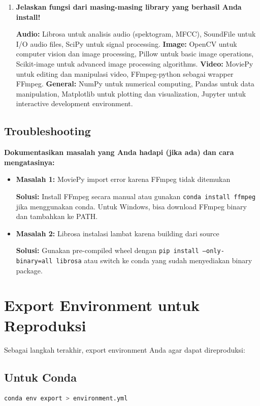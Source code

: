 \documentclass[11pt,a4paper]{article}
\begin{document}
\begin{enumerate}
    \item \textbf{Jelaskan fungsi dari masing-masing library yang berhasil Anda install!}
    
    \textbf{Audio:} Librosa untuk analisis audio (spektogram, MFCC), SoundFile untuk I/O audio files, SciPy untuk signal processing. \textbf{Image:} OpenCV untuk computer vision dan image processing, Pillow untuk basic image operations, Scikit-image untuk advanced image processing algorithms. \textbf{Video:} MoviePy untuk editing dan manipulasi video, FFmpeg-python sebagai wrapper FFmpeg. \textbf{General:} NumPy untuk numerical computing, Pandas untuk data manipulation, Matplotlib untuk plotting dan visualization, Jupyter untuk interactive development environment.
\end{enumerate}

\subsection{Troubleshooting}
\textbf{Dokumentasikan masalah yang Anda hadapi (jika ada) dan cara mengatasinya:}

\begin{itemize}
    \item \textbf{Masalah 1:} MoviePy import error karena FFmpeg tidak ditemukan
    
    \textbf{Solusi:} Install FFmpeg secara manual atau gunakan \texttt{conda install ffmpeg} jika menggunakan conda. Untuk Windows, bisa download FFmpeg binary dan tambahkan ke PATH.
    
    \item \textbf{Masalah 2:} Librosa instalasi lambat karena building dari source
    
    \textbf{Solusi:} Gunakan pre-compiled wheel dengan \texttt{pip install --only-binary=all librosa} atau switch ke conda yang sudah menyediakan binary package.
\end{itemize}

\section{Export Environment untuk Reproduksi}
Sebagai langkah terakhir, export environment Anda agar dapat direproduksi:

\subsection{Untuk Conda}
\begin{lstlisting}[language=bash, caption=Export conda environment]
conda env export > environment.yml
\end{lstlisting}
\end{document}
